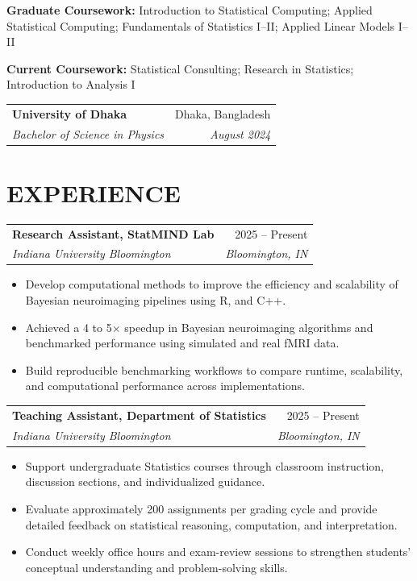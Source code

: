 \documentclass[10pt,letterpaper]{article}
\makeatletter
\newcommand{\resumeEntry}[4]{%
  \begin{tabularx}{\textwidth}{@{}Xr@{}}
    \textbf{#1} & #2 \\
    \textit{#3} & \textit{#4}
  \end{tabularx}%
}
\newenvironment{resumeItems}{%
  \begin{itemize}[
    label=\textbullet,
    leftmargin=14pt,
    labelsep=5pt,
    itemsep=0.5pt,
    topsep=1.0pt,
    parsep=0pt,
    partopsep=0pt
  ]
}{%
  \end{itemize}
}
\makeatother
\begin{document}
\vspace{0.5pt}

\textbf{Graduate Coursework:}
Introduction to Statistical Computing; Applied Statistical Computing;
Fundamentals of Statistics I--II; Applied Linear Models I--II

\vspace{0.3pt}

\textbf{Current Coursework:}
Statistical Consulting; Research in Statistics;
Introduction to Analysis I

\vspace{2.2pt}

\resumeEntry
  {University of Dhaka}
  {Dhaka, Bangladesh}
  {Bachelor of Science in Physics}
  {August 2024}

\section*{EXPERIENCE}

\resumeEntry
  {Research Assistant, StatMIND Lab}
  {2025 -- Present}
  {Indiana University Bloomington}
  {Bloomington, IN}

\begin{resumeItems}
  \item Develop computational methods to improve the efficiency and
  scalability of Bayesian neuroimaging pipelines using R, and C++.

  \item Achieved a 4 to 5$\times$ speedup in Bayesian neuroimaging
  algorithms and benchmarked performance using simulated and real
  fMRI data.

  \item Build reproducible benchmarking workflows to compare runtime,
  scalability, and computational performance across implementations.
\end{resumeItems}

\vspace{1.3pt}

\resumeEntry
  {Teaching Assistant, Department of Statistics}
  {2025 -- Present}
  {Indiana University Bloomington}
  {Bloomington, IN}

\begin{resumeItems}
  \item Support undergraduate Statistics courses
  through classroom instruction, discussion sections, and
  individualized guidance.

  \item Evaluate approximately 200 assignments per grading cycle and
  provide detailed feedback on statistical reasoning, computation,
  and interpretation.

  \item Conduct weekly office hours and exam-review sessions to
  strengthen students' conceptual understanding and problem-solving
  skills.
\end{resumeItems}
\end{document}
